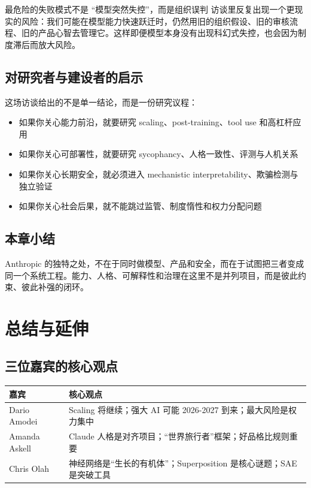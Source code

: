 \documentclass[a4paper]{article}
\begin{document}
\begin{warningbox}{最危险的失败模式不是 ``模型突然失控''，而是组织误判}
访谈里反复出现一个更现实的风险：我们可能在模型能力快速跃迁时，仍然用旧的组织假设、旧的审核流程、旧的产品心智去管理它。这样即便模型本身没有出现科幻式失控，也会因为制度滞后而放大风险。
\end{warningbox}

\subsection{对研究者与建设者的启示}

这场访谈给出的不是单一结论，而是一份研究议程：

\begin{itemize}
    \item 如果你关心能力前沿，就要研究 scaling、post-training、tool use 和高杠杆应用
    \item 如果你关心可部署性，就要研究 sycophancy、人格一致性、评测与人机关系
    \item 如果你关心长期安全，就必须进入 mechanistic interpretability、欺骗检测与独立验证
    \item 如果你关心社会后果，就不能跳过监管、制度惰性和权力分配问题
\end{itemize}

\subsection{本章小结}

Anthropic 的独特之处，不在于同时做模型、产品和安全，而在于试图把三者变成同一个系统工程。能力、人格、可解释性和治理在这里不是并列项目，而是彼此约束、彼此补强的闭环。

\section{总结与延伸}

\subsection{三位嘉宾的核心观点}

\begin{table}[H]
\centering
\begin{tabular}{lp{10cm}}
\toprule
\textbf{嘉宾} & \textbf{核心观点} \\
\midrule
Dario Amodei & Scaling 将继续；强大 AI 可能 2026-2027 到来；最大风险是权力集中 \\
Amanda Askell & Claude 人格是对齐项目；``世界旅行者''框架；好品格比规则重要 \\
Chris Olah & 神经网络是``生长的有机体''；Superposition 是核心谜题；SAE 是突破工具 \\
\bottomrule
\end{tabular}
\end{table}
\end{document}
